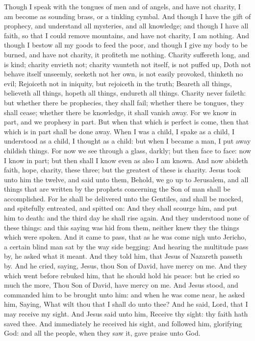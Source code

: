  Though I speak with the tongues of men and of angels, and have not charity, I am become as sounding brass, or a tinkling cymbal. And though I have the gift of prophecy, and understand all mysteries, and all knowledge; and though I have all faith, so that I could remove mountains, and have not charity, I am nothing. And though I bestow all my goods to feed the poor, and though I give my body to be burned, and have not charity, it profiteth me nothing. Charity suffereth long, and is kind; charity envieth not; charity vaunteth not itself, is not puffed up, Doth not behave itself unseemly, seeketh not her own, is not easily provoked, thinketh no evil; Rejoiceth not in iniquity, but rejoiceth in the truth; Beareth all things, believeth all things, hopeth all things, endureth all things. Charity never faileth: but whether there be prophecies, they shall fail; whether there be tongues, they shall cease; whether there be knowledge, it shall vanish away. For we know in part, and we prophesy in part. But when that which is perfect is come, then that which is in part shall be done away. When I was a child, I spake as a child, I understood as a child, I thought as a child: but when I became a man, I put away childish things. For now we see through a glass, darkly; but then face to face: now I know in part; but then shall I know even as also I am known. And now abideth faith, hope, charity, these three; but the greatest of these is charity.
 Jesus took unto him the twelve, and said unto them, Behold, we go up to Jerusalem, and all things that are written by the prophets concerning the Son of man shall be accomplished. For he shall be delivered unto the Gentiles, and shall be mocked, and spitefully entreated, and spitted on: And they shall scourge him, and put him to death: and the third day he shall rise again. And they understood none of these things: and this saying was hid from them, neither knew they the things which were spoken. And it came to pass, that as he was come nigh unto Jericho, a certain blind man sat by the way side begging: And hearing the multitude pass by, he asked what it meant. And they told him, that Jesus of Nazareth passeth by. And he cried, saying, Jesus, thou Son of David, have mercy on me. And they which went before rebuked him, that he should hold his peace: but he cried so much the more, Thou Son of David, have mercy on me. And Jesus stood, and commanded him to be brought unto him: and when he was come near, he asked him, Saying, What wilt thou that I shall do unto thee? And he said, Lord, that I may receive my sight. And Jesus said unto him, Receive thy sight: thy faith hath saved thee. And immediately he received his sight, and followed him, glorifying God: and all the people, when they saw it, gave praise unto God.

